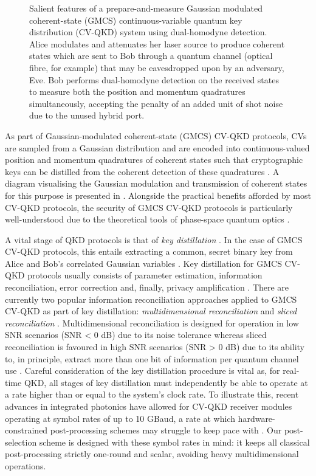 ﻿\documentclass[12pt]{article}
\begin{document}
\begin{figure}[t]
\begin{tikzpicture}
\end{tikzpicture}
\caption{Salient features of a prepare-and-measure Gaussian modulated coherent-state (GMCS) continuous-variable quantum key distribution (CV-QKD) system using dual-homodyne detection. Alice modulates and attenuates her laser source to produce coherent states which are sent to Bob through a quantum channel (optical fibre, for example) that may be eavesdropped upon by an adversary, Eve. Bob performs dual-homodyne detection on the received states to measure both the position and momentum quadratures simultaneously, accepting the penalty of an added unit of shot noise due to the unused hybrid port.}
\label{fig: basic hardware schematic}
\end{figure}

As part of Gaussian-modulated coherent-state (GMCS) CV-QKD protocols, CVs are sampled from a Gaussian distribution and are encoded into continuous-valued position and momentum quadratures of coherent states such that cryptographic keys can be distilled from the coherent detection of these quadratures \cite{Grosshans-2003, Laudenbach-2018}. A diagram visualising the Gaussian modulation and transmission of coherent states for this purpose is presented in . Alongside the practical benefits afforded by most CV-QKD protocols, the security of GMCS CV-QKD protocols is particularly well-understood due to the theoretical tools of phase-space quantum optics \cite{Garcia-Patron-2006, Navascues-2006, Leverrier-2010, Leverrier-2013, Leverrier-2017a, Kaur-2021}.

A vital stage of QKD protocols is that of \textit{key distillation} \cite{Assche-2006}. In the case of GMCS CV-QKD protocols, this entails extracting a common, secret binary key from Alice and Bob's  correlated Gaussian variables \cite{VanAssche-2004}. Key distillation for GMCS CV-QKD protocols usually consists of parameter estimation, information reconciliation, error correction and, finally, privacy amplification \cite{Pirandola-2020}. There are currently two popular information reconciliation approaches applied to GMCS CV-QKD as part of key distillation: \textit{multidimensional reconciliation} and \textit{sliced reconciliation} \cite{VanAssche-2004, Leverrier-2008}. Multidimensional reconciliation is designed for operation in low SNR scenarios (SNR < 0 dB) due to its noise tolerance whereas sliced reconciliation is favoured in high SNR scenarios (SNR > 0 dB) due to its ability to, in principle, extract more than one bit of information per quantum channel use \cite{Zhang-2024a, Jouguet-2014}. Careful consideration of the key distillation procedure is vital as, for real-time  QKD, all stages of key distillation must independently be able to operate at a rate higher than or equal to the system's clock rate. To illustrate this, recent advances in integrated photonics have allowed for CV-QKD receiver modules operating at symbol rates of up to 10 GBaud, a rate at which hardware-constrained post-processing schemes may struggle to keep pace with \cite{Hajomer-2024a}. Our post-selection scheme is designed with these symbol rates in mind: it keeps all classical post-processing strictly one-round and scalar, avoiding heavy multidimensional operations.
\end{document}
